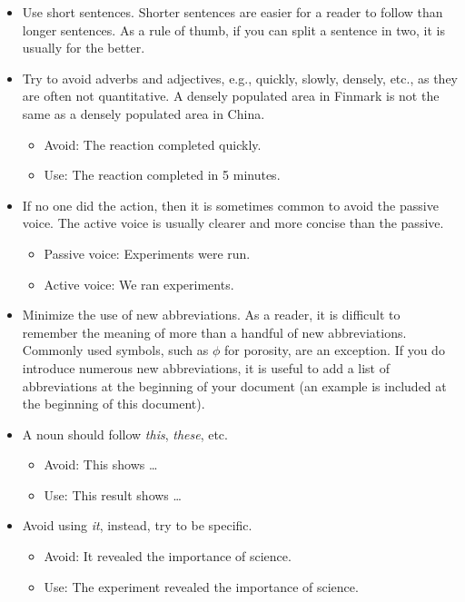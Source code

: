 \begin{itemize}
    \item Use short sentences. Shorter sentences are easier for a reader to follow than longer sentences. As a rule of thumb, if you can split a sentence in two, it is usually for the better.
    \item Try to avoid adverbs and adjectives, e.g., quickly, slowly, densely, etc., as they are often not quantitative. A densely populated area in Finmark is not the same as a densely populated area in China.
    \begin{itemize}
        \item Avoid: The reaction completed quickly.
        \item Use: The reaction completed in 5 minutes.
    \end{itemize}
    \item If no one did the action, then it is sometimes common to avoid the passive voice. The active voice is usually clearer and more concise than the passive.
    \begin{itemize}
        \item Passive voice: Experiments were run.
        \item Active voice: We ran experiments.
    \end{itemize}
    \item Minimize the use of new abbreviations. As a reader, it is difficult to remember the meaning of more than a handful of new abbreviations. Commonly used symbols, such as $\phi$ for porosity, are an exception. If you do introduce numerous new abbreviations, it is useful to add a list of abbreviations at the beginning of your document (an example is included at the beginning of this document).
    \item A noun should follow \emph{this}, \emph{these}, etc.
    \begin{itemize}
        \item Avoid: This shows \dots
        \item Use: This result shows \dots
    \end{itemize}
    \item Avoid using \emph{it}, instead, try to be specific.
    \begin{itemize}
        \item Avoid: It revealed the importance of science.
        \item Use: The experiment revealed the importance of science.
    \end{itemize}

\end{itemize}
